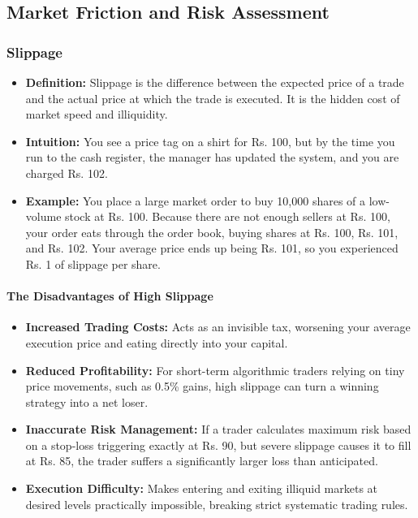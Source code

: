 \documentclass[12pt,openany]{book}
\begin{document}
\subsection{Market Friction and Risk Assessment}

\subsubsection{Slippage}

\begin{itemize}[leftmargin=*]
    \item \textbf{Definition:} Slippage is the difference between the expected price of a trade and the actual price at which the trade is executed. It is the hidden cost of market speed and illiquidity.
    \item \textbf{Intuition:} You see a price tag on a shirt for Rs. 100, but by the time you run to the cash register, the manager has updated the system, and you are charged Rs. 102.
    \item \textbf{Example:} You place a large market order to buy 10,000 shares of a low-volume stock at Rs. 100. Because there are not enough sellers at Rs. 100, your order eats through the order book, buying shares at Rs. 100, Rs. 101, and Rs. 102. Your average price ends up being Rs. 101, so you experienced Rs. 1 of slippage per share.
\end{itemize}

\paragraph{The Disadvantages of High Slippage}
\begin{itemize}[leftmargin=*]
    \item \textbf{Increased Trading Costs:} Acts as an invisible tax, worsening your average execution price and eating directly into your capital.
    \item \textbf{Reduced Profitability:} For short-term algorithmic traders relying on tiny price movements, such as 0.5\% gains, high slippage can turn a winning strategy into a net loser.
    \item \textbf{Inaccurate Risk Management:} If a trader calculates maximum risk based on a stop-loss triggering exactly at Rs. 90, but severe slippage causes it to fill at Rs. 85, the trader suffers a significantly larger loss than anticipated.
    \item \textbf{Execution Difficulty:} Makes entering and exiting illiquid markets at desired levels practically impossible, breaking strict systematic trading rules.
\end{itemize}
\end{document}
